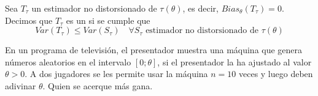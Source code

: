 \begin{definicion}
    Sea $T_{\tau}$ un estimador no distorsionado de $\tau(\theta)$, es decir, $Bias_{\theta}(T_{\tau})=0$. Decimos que $T_{\tau}$ es un  si se cumple que 
    \begin{equation*}
        Var(T_{\tau}) \leq Var(S_{\tau}) \quad \forall S_{\tau} \text{ estimador no distorsionado de } \tau(\theta)
    \end{equation*}
\end{definicion}
\begin{ejemplo}[Libro 7.3]
    En un programa de televisión, el presentador muestra una máquina que genera números aleatorios en el intervalo $[0; \theta]$, si el presentador la ha ajustado al valor $\theta > 0$. A dos jugadores se les permite usar la máquina $n = 10$ veces y luego deben adivinar $\theta$. Quien se acerque más gana. \\


\end{ejemplo}
